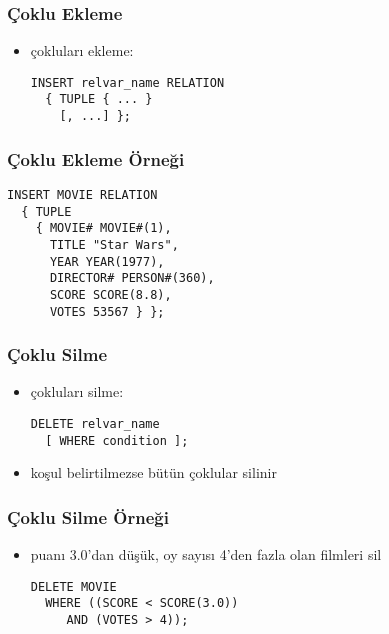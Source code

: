 \documentclass[dvipsnames]{beamer}
\theoremstyle{plain}
\begin{document}

\begin{frame}[fragile]
  \frametitle{Çoklu Ekleme}

  \begin{itemize}
    \item çokluları ekleme:
    \begin{lstlisting}
INSERT relvar_name RELATION
  { TUPLE { ... }
    [, ...] };
    \end{lstlisting}
  \end{itemize}
\end{frame}

\begin{frame}[fragile]
  \frametitle{Çoklu Ekleme Örneği}

  \begin{lstlisting}
INSERT MOVIE RELATION
  { TUPLE
    { MOVIE# MOVIE#(1),
      TITLE "Star Wars",
      YEAR YEAR(1977),
      DIRECTOR# PERSON#(360),
      SCORE SCORE(8.8),
      VOTES 53567 } };
  \end{lstlisting}
\end{frame}

\begin{frame}[fragile]
  \frametitle{Çoklu Silme}
  
  \begin{itemize}
    \item çokluları silme:
    \begin{lstlisting}
DELETE relvar_name
  [ WHERE condition ];
    \end{lstlisting}

    \item koşul belirtilmezse bütün çoklular silinir
  \end{itemize}
\end{frame}

\begin{frame}[fragile]
  \frametitle{Çoklu Silme Örneği}

  \begin{itemize}
    \item puanı 3.0'dan düşük, oy sayısı 4'den fazla olan filmleri sil
    \begin{lstlisting}
DELETE MOVIE
  WHERE ((SCORE < SCORE(3.0))
     AND (VOTES > 4));
    \end{lstlisting}
  \end{itemize}
\end{frame}
\end{document}
